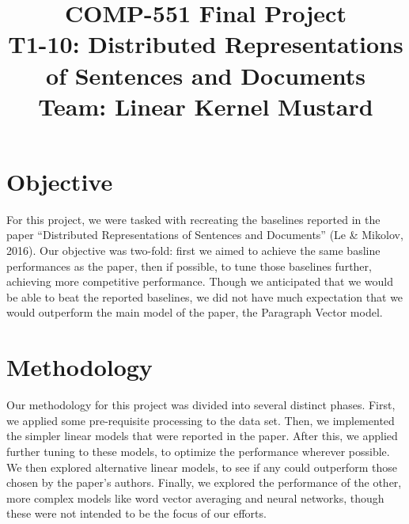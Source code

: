 \documentclass[conference]{IEEEtran}
\begin{document}
\title{COMP-551 Final Project\\
{\LARGE T1-10: Distributed Representations of Sentences and Documents}\\
{\Large Team: Linear Kernel Mustard}
}

\author{
\and
{}
\and
{}
}

\maketitle

\section{Objective}

For this project, we were tasked with recreating the baselines reported in the paper ``Distributed Representations of Sentences and Documents'' (Le \& Mikolov, 2016). Our objective was two-fold: first we aimed to achieve the same basline performances as the paper, then if possible, to tune those baselines further, achieving more competitive performance. Though we anticipated that we would be able to beat the reported baselines, we did not have much expectation that we would outperform the main model of the paper, the Paragraph Vector model.


\section{Methodology}

Our methodology for this project was divided into several distinct phases. First, we applied some pre-requisite processing to the data set. Then, we implemented the simpler linear models that were reported in the paper. After this, we applied further tuning to these models, to optimize the performance wherever possible. We then explored alternative linear models, to see if any could outperform those chosen by the paper's authors. Finally, we explored the performance of the other, more complex models like word vector averaging and neural networks, though these were not intended to be the focus of our efforts.
\end{document}
